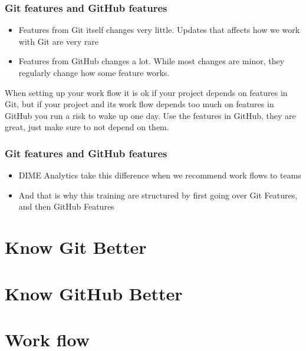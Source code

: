 \documentclass[aspectratio=169]{beamer} %
\begin{document}
\begin{frame}
	\frametitle{Git features and GitHub features}

	\begin{itemize}
		\item Features from Git itself changes very little. Updates that affects how we work with Git are very rare
		\item Features from GitHub changes a lot. While most changes are minor, they regularly change how some feature works.
	\end{itemize}

	When setting up your work flow it is ok if your project depends on features in Git, but if your project and its work flow depends too much on features in GitHub you run a risk to wake up one day.	Use the features in GitHub, they are great, just make sure to not depend on them.

\end{frame}

\begin{frame}
	\frametitle{Git features and GitHub features}

	\begin{itemize}
		\item DIME Analytics take this difference when we recommend work flows to teams
		\item And that is why this training are structured by first going over Git Features, and then GitHub Features
	\end{itemize}
\end{frame}

\section{Know Git Better}

\section{Know GitHub Better}

\section{Work flow}
\end{document}
